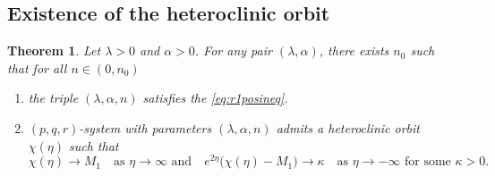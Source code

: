 \documentclass[a4paper,11pt]{article}
\newtheorem{theorem}{Theorem}
\begin{document}
\subsection{Existence of the heteroclinic orbit} \label{sec:proof_proof}

\begin{theorem} \label{thm1}
Let $\lambda>0$ and $\alpha>0$. For any pair $(\lambda,\alpha)$, there exists $n_0$ such that for all $n \in (0,n_0)$
\begin{enumerate}
    \item[(i)] the triple $(\lambda,\alpha,n)$ satisfies the \eqref{eq:r1posineq}.
    \item[(ii)] $(p,q,r)$-system with parameters $(\lambda,\alpha,n)$ admits a heteroclinic orbit $\chi(\eta)$ such that
    \begin{equation} \label{eq:estimate}
        \chi(\eta) \rightarrow M_1 \quad \text{as $\eta \rightarrow \infty$ and} \quad e^{2\eta}\big(\chi(\eta) - M_1\big) \rightarrow \kappa \quad \text{as $\eta \rightarrow -\infty$ for some $\kappa>0$}.
    \end{equation}
\end{enumerate}
\end{theorem}
\end{document}
